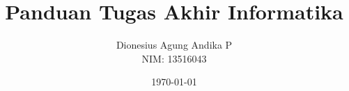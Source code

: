 \documentclass[12pt, a4paper, onecolumn, oneside, final]{report}
\begin{document}
    \title{Panduan Tugas Akhir Informatika}
    \date{\today}
    \author{
        Dionesius Agung Andika P \\
        NIM: 13516043
    }

    \setcounter{page}{0}

    
    
    

    \pagestyle{plain}

    
    
    

    \renewcommand*\contentsname{DAFTAR ISI}
    \renewcommand*\appendixtocname{DAFTAR LAMPIRAN}
    \renewcommand*\listfigurename{DAFTAR GAMBAR}
    \renewcommand*\listtablename{DAFTAR TABEL}
    \renewcommand*\bibname{DAFTAR PUSTAKA}

    \tableofcontents
    \listofappendices
    {%
		\let\oldnumberline\numberline%
		\renewcommand{\numberline}{\figurename~\oldnumberline}%
		\listoffigures%
	}
	{%
		\let\oldnumberline\numberline%
		\renewcommand{\numberline}{\tablename~\oldnumberline}%
		\listoftables%
	}

    
    \renewcommand{\chaptername}{BAB}
    \renewcommand{\thechapter}{\Roman{chapter}}

    
    
    
    
    
\end{document}
